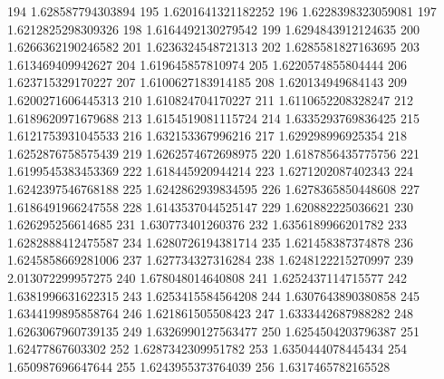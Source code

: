 194 1.628587794303894
195 1.6201641321182252
196 1.6228398323059081
197 1.6212825298309326
198 1.6164492130279542
199 1.6294843912124635
200 1.6266362190246582
201 1.6236324548721313
202 1.6285581827163695
203 1.613469409942627
204 1.619645857810974
205 1.6220574855804444
206 1.623715329170227
207 1.6100627183914185
208 1.620134949684143
209 1.6200271606445313
210 1.610824704170227
211 1.6110652208328247
212 1.6189620971679688
213 1.6154519081115724
214 1.6335293769836425
215 1.6121753931045533
216 1.632153367996216
217 1.629298996925354
218 1.6252876758575439
219 1.6262574672698975
220 1.6187856435775756
221 1.6199545383453369
222 1.618445920944214
223 1.6271202087402343
224 1.6242397546768188
225 1.6242862939834595
226 1.6278365850448608
227 1.6186491966247558
228 1.6143537044525147
229 1.620882225036621
230 1.626295256614685
231 1.630773401260376
232 1.6356189966201782
233 1.6282888412475587
234 1.6280726194381714
235 1.621458387374878
236 1.6245858669281006
237 1.627734327316284
238 1.6248122215270997
239 2.013072299957275
240 1.678048014640808
241 1.6252437114715577
242 1.6381996631622315
243 1.6253415584564208
244 1.6307643890380858
245 1.6344199895858764
246 1.621861505508423
247 1.6333442687988282
248 1.6263067960739135
249 1.6326990127563477
250 1.6254504203796387
251 1.62477867603302
252 1.6287342309951782
253 1.6350444078445434
254 1.650987696647644
255 1.6243955373764039
256 1.6317465782165528

